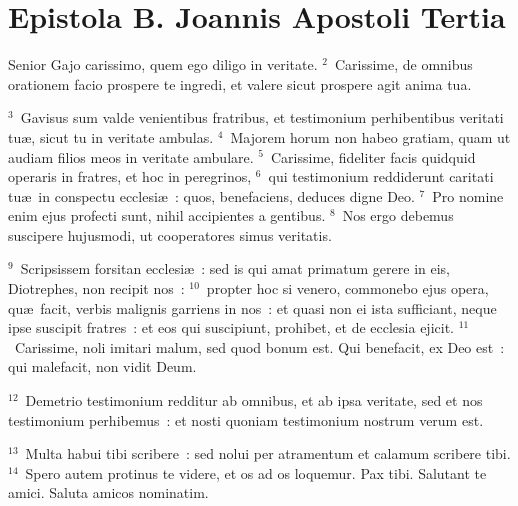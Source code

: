 \newpage
{\centering \section*{Epistola B. Joannis Apostoli Tertia}}\thispagestyle{empty}

\noindent Senior Gajo carissimo, quem ego diligo in veritate.
${}^{2}$~Carissime, de omnibus orationem facio prospere te ingredi, et valere sicut prospere agit anima tua.


${}^{3}$~Gavisus sum valde venientibus fratribus, et testimonium perhibentibus veritati tu\ae , sicut tu in veritate ambulas.
${}^{4}$~Majorem horum non habeo gratiam, quam ut audiam filios meos in veritate ambulare.
${}^{5}$~Carissime, fideliter facis quidquid operaris in fratres, et hoc in peregrinos,
${}^{6}$~qui testimonium reddiderunt caritati tu\ae\ in conspectu ecclesi\ae~: quos, benefaciens, deduces digne Deo.
${}^{7}$~Pro nomine enim ejus profecti sunt, nihil accipientes a gentibus.
${}^{8}$~Nos ergo debemus suscipere hujusmodi, ut cooperatores simus veritatis.


${}^{9}$~Scripsissem forsitan ecclesi\ae~: sed is qui amat primatum gerere in eis, Diotrephes, non recipit nos~:
${}^{10}$~propter hoc si venero, commonebo ejus opera, qu\ae\ facit, verbis malignis garriens in nos~: et quasi non ei ista sufficiant, neque ipse suscipit fratres~: et eos qui suscipiunt, prohibet, et de ecclesia ejicit.
${}^{11}$~Carissime, noli imitari malum, sed quod bonum est. Qui benefacit, ex Deo est~: qui malefacit, non vidit Deum.


${}^{12}$~Demetrio testimonium redditur ab omnibus, et ab ipsa veritate, sed et nos testimonium perhibemus~: et nosti quoniam testimonium nostrum verum est.


${}^{13}$~Multa habui tibi scribere~: sed nolui per atramentum et calamum scribere tibi.
${}^{14}$~Spero autem protinus te videre, et os ad os loquemur. Pax tibi. Salutant te amici. Saluta amicos nominatim.
